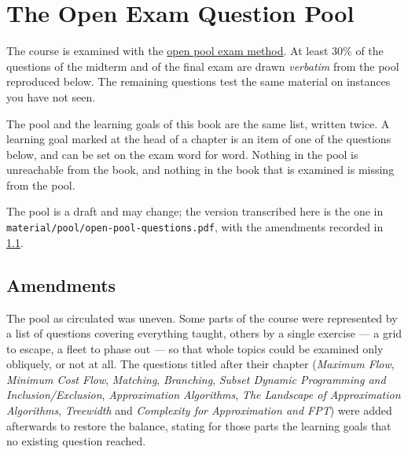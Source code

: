 
\chapter{The Open Exam Question Pool}
\label{app:pool}

The course is examined with the
\href{https://openpoolexams.science.uu.nl/}{open pool exam method}. At least
$30\%$ of the questions of the midterm and of the final exam are drawn
\emph{verbatim} from the pool reproduced below. The remaining questions test the
same material on instances you have not seen.

The pool and the learning goals of this book are the same list, written twice. A
learning goal marked \pooltag{} at the head of a chapter is an item of one of the
questions below, and can be set on the exam word for word. Nothing in the pool
is unreachable from the book, and nothing in the book that is examined is
missing from the pool.

The pool is a draft and may change; the version transcribed here is the one in
\texttt{material/pool/open-pool-questions.pdf}, with the amendments recorded in
\cref{sec:pool-amendments}.

\section{Amendments}
\label{sec:pool-amendments}

The pool as circulated was uneven. Some parts of the course were represented by
a list of questions covering everything taught, others by a single exercise ---
a grid to escape, a fleet to phase out --- so that whole topics could be
examined only obliquely, or not at all. The questions titled after their chapter
(\emph{Maximum Flow}, \emph{Minimum Cost Flow}, \emph{Matching},
\emph{Branching}, \emph{Subset Dynamic Programming and Inclusion/Exclusion},
\emph{Approximation Algorithms}, \emph{The Landscape of Approximation
Algorithms}, \emph{Treewidth} and \emph{Complexity for Approximation and FPT})
were added afterwards to restore the balance, stating for those parts the
learning goals that no existing question reached.

